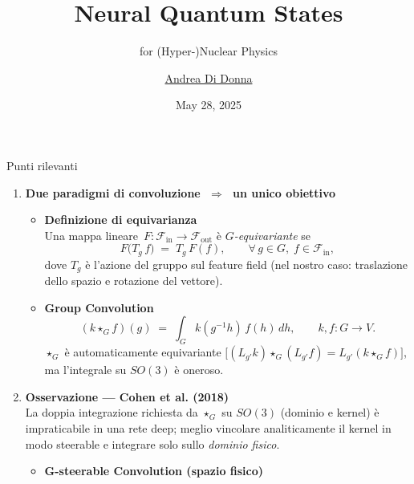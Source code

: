 \documentclass[aspectratio=32,8pt]{beamer}
\title{Neural Quantum States}
\subtitle{for (Hyper-)Nuclear Physics}
\author{\href{mailto:andrea.didonna@unitn.it}{Andrea Di Donna}}
\date{May 28, 2025}
\begin{document}
\frame{\titlepage}


\begin{frame}{Punti rilevanti}
\tiny
\begin{enumerate}
\item \textbf{Due paradigmi di convoluzione \(\;\Rightarrow\;\) un unico obiettivo}

  \begin{itemize}\tiny
  \item \textbf{Definizione di equivarianza}\\[2pt]
        Una mappa lineare \(\,F\colon\!\mathcal F_{\text{in}}\!\to\!\mathcal F_{\text{out}}\)
        è \emph{\(G\)-equivariante} se
        \[
           F\bigl(T_g\,f\bigr) \;=\; T_g\,F(f),
           \qquad
           \forall\,g\in G,\;f\in\mathcal F_{\text{in}},
        \]
        dove \(T_g\) è l’azione del gruppo sul feature field
        (nel nostro caso: traslazione dello spazio e rotazione del vettore).
        \\[4pt]

  \item \textbf{Group Convolution}\\[2pt]
        \[
           (k\star_G f)(g)
           \;=\;
           \int_G k(g^{-1}h)\,f(h)\,dh,
           \qquad
           k,f : G \to V.
        \]
        \(\star_G\) è automaticamente equivariante \(\bigl[(L_{g'}k)\star_G(L_{g'}f)=L_{g'}(k\star_G f)\bigr]\),
        ma l’integrale su \(SO(3)\) è oneroso.
\end{itemize}
\item \textbf{Osservazione — Cohen et al. (2018)}\\[2pt]
      La doppia integrazione richiesta da \(\star_G\) su \(SO(3)\)
      (dominio e kernel) è impraticabile in una rete deep;  
      meglio vincolare analiticamente il kernel in modo steerable
      e integrare solo sullo \emph{dominio fisico}.

\begin{itemize}
\tiny

  \item \textbf{G-steerable Convolution (spazio fisico)}\\[2pt]
  \centering


\end{itemize}
\end{enumerate}
\end{frame}
\end{document}
